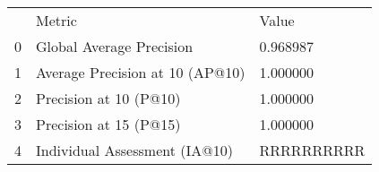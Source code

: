 \begin{tabular}{lll}
 & Metric & Value \\
0 & Global Average Precision & 0.968987 \\
1 & Average Precision at 10 (AP@10) & 1.000000 \\
2 & Precision at 10 (P@10) & 1.000000 \\
3 & Precision at 15 (P@15) & 1.000000 \\
4 & Individual Assessment (IA@10) & RRRRRRRRRR \\
\end{tabular}
